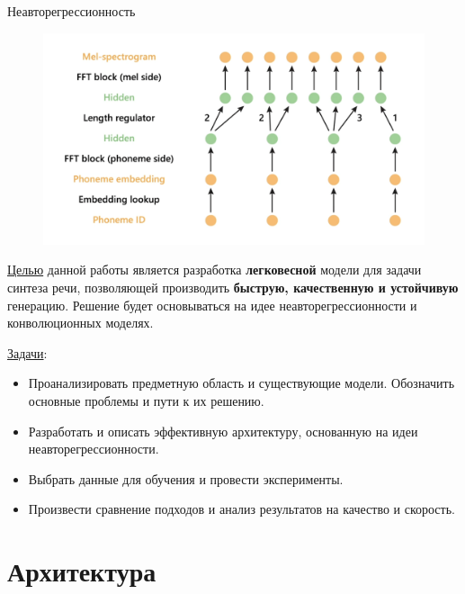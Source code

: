 \begin{frame}{Неавторегрессионность}
\begin{figure}[H]
\centering
\includegraphics[width=1.0\textwidth]{images/fastspeech/alignment.png}
\end{figure}
\end{frame}

\begin{frame}
\underline{Целью} данной работы является разработка \textbf{легковесной} модели для задачи синтеза речи, позволяющей производить \textbf{быструю, качественную и устойчивую} генерацию. Решение будет основываться на идее неавторегрессионности и конволюционных моделях.

\underline{Задачи}:
\begin{itemize}
    \item Проанализировать предметную область и существующие модели. Обозначить основные проблемы и пути к их решению.
    \item Разработать и описать эффективную архитектуру, основанную на идеи неавторегрессионности.
    \item Выбрать данные для обучения и провести эксперименты.
    \item Произвести сравнение подходов и анализ результатов на качество и скорость.
\end{itemize}
\end{frame}

\section{Архитектура}

